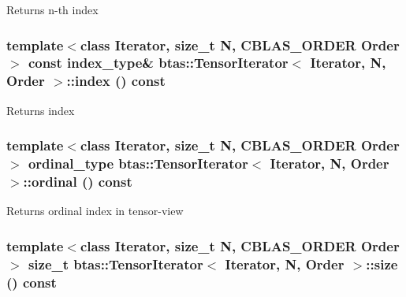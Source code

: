 \label{classbtas_1_1_tensor_iterator_a095c6060b59b45cb7ff6f85fd240948b}
\begin{DoxyReturn}{Returns}
n-\/th index 
\end{DoxyReturn}
\hypertarget{classbtas_1_1_tensor_iterator_a7afd5a83f9efe78e6e85b8c4aadd4494}{
\subsubsection[{index}]{\setlength{\rightskip}{0pt plus 5cm}template$<$class Iterator, size\_\-t N, CBLAS\_\-ORDER Order$>$ const index\_\-type\& {\bf btas::TensorIterator}$<$ Iterator, N, Order $>$::index () const}}
\label{classbtas_1_1_tensor_iterator_a7afd5a83f9efe78e6e85b8c4aadd4494}
\begin{DoxyReturn}{Returns}
index 
\end{DoxyReturn}
\hypertarget{classbtas_1_1_tensor_iterator_a65615e9a1eb4fa5178fdbe8fa49da303}{
\subsubsection[{ordinal}]{\setlength{\rightskip}{0pt plus 5cm}template$<$class Iterator, size\_\-t N, CBLAS\_\-ORDER Order$>$ ordinal\_\-type {\bf btas::TensorIterator}$<$ Iterator, N, Order $>$::ordinal () const}}
\label{classbtas_1_1_tensor_iterator_a65615e9a1eb4fa5178fdbe8fa49da303}
\begin{DoxyReturn}{Returns}
ordinal index in tensor-\/view 
\end{DoxyReturn}
\hypertarget{classbtas_1_1_tensor_iterator_adddb70a169a79dbf3ca20b2aaa9d7bbc}{
\subsubsection[{size}]{\setlength{\rightskip}{0pt plus 5cm}template$<$class Iterator, size\_\-t N, CBLAS\_\-ORDER Order$>$ size\_\-t {\bf btas::TensorIterator}$<$ Iterator, N, Order $>$::size () const}}
